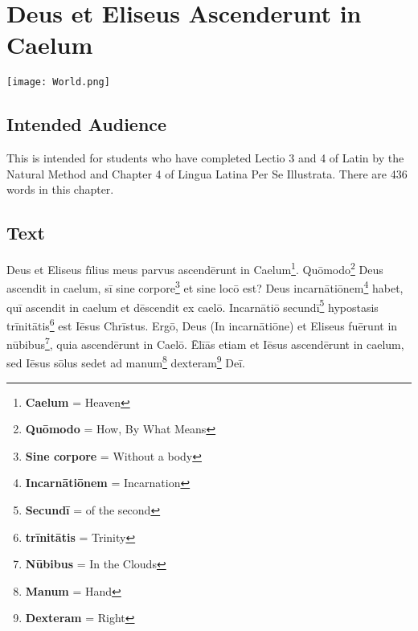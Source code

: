 \chapter{Deus et Eliseus Ascenderunt in Caelum}
\begin{center}
\texttt{[image: World.png]}
\end{center}

\section{Intended Audience}
This is intended for students who have completed Lectio 3 and 4 of Latin by the Natural Method and Chapter 4 of Lingua Latina Per Se Illustrata. There are 436 words in this chapter.

\section{Text}
Deus et Eliseus fīlius meus parvus ascendērunt in Caelum\footnote{\textbf{Caelum} = Heaven}. Quōmodo\footnote{\textbf{Quōmodo} = How, By What Means} Deus ascendit in caelum, sī sine corpore\footnote{\textbf{Sine corpore} = Without a body} et sine locō est? Deus incarnātiōnem\footnote{\textbf{Incarnātiōnem} = Incarnation} habet, quī ascendit in caelum et dēscendit ex caelō. Incarnātiō secundī\footnote{\textbf{Secundī} = of the second} hypostasis trīnitātis\footnote{\textbf{trīnitātis} = Trinity} est Iēsus Chrīstus. Ergō, Deus (In incarnātiōne) et Eliseus fuērunt in nūbibus\footnote{\textbf{Nūbibus} = In the Clouds}, quia ascendērunt in Caelō. Ēlīās etiam et Iēsus ascendērunt in caelum, sed Iēsus sōlus sedet ad manum\footnote{\textbf{Manum} = Hand} dexteram\footnote{\textbf{Dexteram} = Right} Deī. \par
